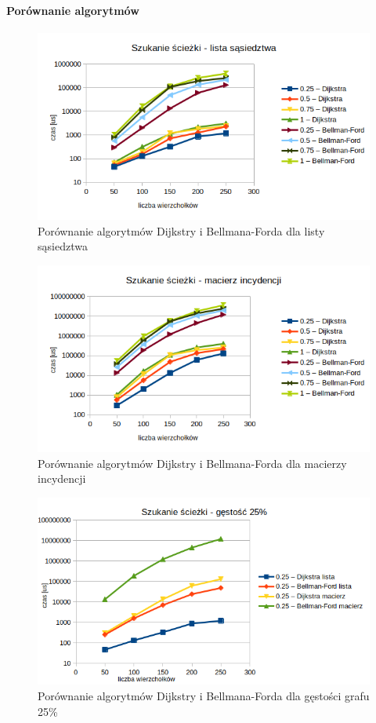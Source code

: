 \documentclass[11pt]{article}
\begin{document}
\paragraph{Porównanie algorytmów}
\begin{figure}[H]
    \includegraphics[width=13cm]{images/dijkstrabellmanlista.png}
    \caption{ Porównanie algorytmów Dijkstry i Bellmana-Forda dla listy sąsiedztwa}
\end{figure}

\begin{figure}[H]
    \includegraphics[width=13cm]{images/dijkstrabellmanmacierz.png}
    \caption{ Porównanie algorytmów Dijkstry i Bellmana-Forda dla macierzy incydencji}
\end{figure}

\begin{figure}[H]
    \includegraphics[width=13cm]{images/db25.png}
    \caption{ Porównanie algorytmów Dijkstry i Bellmana-Forda dla gęstości grafu 25\%}
\end{figure}
\end{document}
